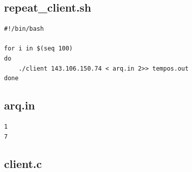 \documentclass[11pt,twoside]{article}
\begin{document}
\subsection{repeat\_client.sh}
\begin{verbatim}
#!/bin/bash

for i in $(seq 100)
do
    ./client 143.106.150.74 < arq.in 2>> tempos.out
done
\end{verbatim}

\subsection{arq.in}
\begin{verbatim}
1
7
\end{verbatim}

\subsection{client.c}
\end{document}
